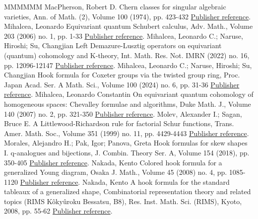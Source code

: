 \begin{thebibliography}{MMMMMM}
 MacPherson, Robert D. Chern classes for singular algebraic varieties, Ann. of Math. (2), Volume 100 (1974), pp. 423-432 \href{https://alco.centre-mersenne.org/articles/10.5802/alco.428/#macpherson:chern}{Publisher reference}.
 Mihalcea, Leonardo Equivariant quantum Schubert calculus, Adv. Math., Volume 203 (2006) no. 1, pp. 1-33 \href{https://alco.centre-mersenne.org/articles/10.5802/alco.428/#mihalcea:eqqgr}{Publisher reference}.
 Mihalcea, Leonardo C.; Naruse, Hiroshi; Su, Changjian Left Demazure-Lusztig operators on equivariant (quantum) cohomology and K-theory, Int. Math. Res. Not. IMRN (2022) no. 16, pp. 12096-12147 \href{https://alco.centre-mersenne.org/articles/10.5802/alco.428/#mihalcea2020left}{Publisher reference}.
 Mihalcea, Leonardo C.; Naruse, Hiroshi; Su, Changjian Hook formula for Coxeter groups via the twisted group ring, Proc. Japan Acad. Ser. A Math. Sci., Volume 100 (2024) no. 6, pp. 31-36 \href{https://alco.centre-mersenne.org/articles/10.5802/alco.428/#MNS24Coxeterhook}{Publisher reference}.
 Mihalcea, Leonardo Constantin On equivariant quantum cohomology of homogeneous spaces: Chevalley formulae and algorithms, Duke Math. J., Volume 140 (2007) no. 2, pp. 321-350 \href{https://alco.centre-mersenne.org/articles/10.5802/alco.428/#mihalcea:eqqhom}{Publisher reference}.
 Molev, Alexander I.; Sagan, Bruce E. A Littlewood-Richardson rule for factorial Schur functions, Trans. Amer. Math. Soc., Volume 351 (1999) no. 11, pp. 4429-4443 \href{https://alco.centre-mersenne.org/articles/10.5802/alco.428/#molev.sagan:Littlewood-Richardson}{Publisher reference}.
 Morales, Alejandro H.; Pak, Igor; Panova, Greta Hook formulas for skew shapes I. q-analogues and bijections, J. Combin. Theory Ser. A, Volume 154 (2018), pp. 350-405 \href{https://alco.centre-mersenne.org/articles/10.5802/alco.428/#morales.pak.panovaLhook}{Publisher reference}.
 Nakada, Kento Colored hook formula for a generalized Young diagram, Osaka J. Math., Volume 45 (2008) no. 4, pp. 1085-1120 \href{https://alco.centre-mersenne.org/articles/10.5802/alco.428/#nakada:colored}{Publisher reference}.
 Nakada, Kento A hook formula for the standard tableaux of a generalized shape, Combinatorial representation theory and related topics (RIMS Kôkyûroku Bessatsu, B8), Res. Inst. Math. Sci. (RIMS), Kyoto, 2008, pp. 55-62 \href{https://alco.centre-mersenne.org/articles/10.5802/alco.428/#nakada:proc}{Publisher reference}.

\end{thebibliography}

